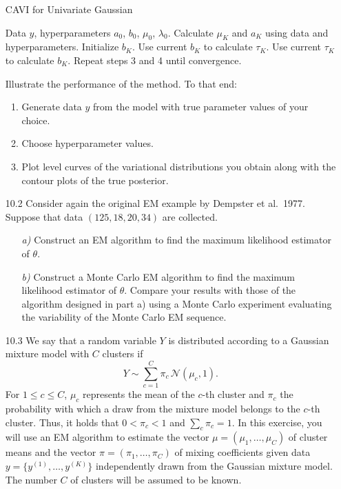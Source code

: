 \begin{enumerate}
\begin{algorithm}[H]
  \caption{CAVI for Univariate Gaussian}
  \label{alg:10.3}
  \begin{algorithmic}[1]
    \Require Data $y$, hyperparameters $a_0$, $b_0$, $\mu_0$, $\lambda_0$.
    \State Calculate $\mu_K$ and $a_K$ using data and hyperparameters.
    \State Initialize $b_K$.
    \State Use current $b_K$ to calculate $\tau_K$.
    \State Use current $\tau_K$ to calculate $b_K$.
    \State Repeat steps 3 and 4 until convergence.
  \end{algorithmic}
\end{algorithm}

Illustrate the performance of the method. To that end:
\begin{enumerate}
  \item Generate data $y$ from the model with true parameter values of your choice.
  \item Choose hyperparameter values.
  \item Plot level curves of the variational distributions you obtain along with the contour plots
        of the true posterior.
\end{enumerate}

\item[10.2] Consider again the original EM example by Dempster et al.\ 1977. Suppose that data
$(125, 18, 20, 34)$ are collected.

\begin{enumerate}
  \item[\textit{a)}] Construct an EM algorithm to find the maximum likelihood estimator of $\theta$.
  \item[\textit{b)}] Construct a Monte Carlo EM algorithm to find the maximum likelihood estimator
        of $\theta$. Compare your results with those of the algorithm designed in part a) using a
        Monte Carlo experiment evaluating the variability of the Monte Carlo EM sequence.
\end{enumerate}

\item[10.3] We say that a random variable $Y$ is distributed according to a Gaussian mixture model
with $C$ clusters if
\begin{equation}
  Y \sim \sum_{c=1}^{C} \pi_c\, \mathcal{N}(\mu_c, 1).
  \label{eq:10.6}
\end{equation}
For $1 \leq c \leq C$, $\mu_c$ represents the mean of the $c$-th cluster and $\pi_c$ the
probability with which a draw from the mixture model belongs to the $c$-th cluster. Thus, it holds
that $0 < \pi_c < 1$ and $\sum_c \pi_c = 1$. In this exercise, you will use an EM algorithm to
estimate the vector $\mu = (\mu_1, \ldots, \mu_C)$ of cluster means and the vector
$\pi = (\pi_1, \ldots, \pi_C)$ of mixing coefficients given data $y = \{y^{(1)}, \ldots, y^{(K)}\}$
independently drawn from the Gaussian mixture model. The number $C$ of clusters will be assumed to
be known.


\end{enumerate}
